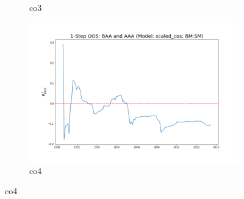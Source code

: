 \documentclass[a4paper,12pt,times,numbered,print,index]{report}
\numberwithin{equation}{section}
\begin{document}
\begin{figure}[!htbp]
\begin{subfigure}[b]{0.42\linewidth}
			\caption{co3}
		\end{subfigure}
		\begin{subfigure}[b]{0.42\linewidth}
			\includegraphics[width=0.9\linewidth]{OOS_plots/scaled_cos_co4_SM.png}
			\caption{co4}
		\end{subfigure}
		\label{g4}
	\end{figure}
	
\end{document}
